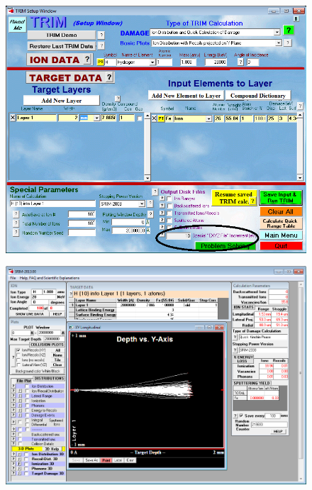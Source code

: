 \documentclass[12pt,twoside]{manual}
\begin{document}
\FloatBarrier

\begin{figure}[h]
  \begin{center}
    \includegraphics[scale=0.50]{img/srim1}
  \end{center}
\end{figure}

\begin{figure}[h]
  \begin{center}
    \includegraphics[scale=0.40]{img/srim2}
  \end{center}
\end{figure}
\end{document}

